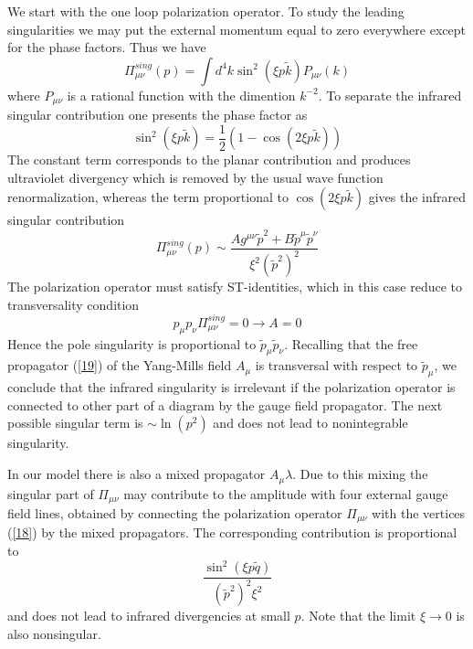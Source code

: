 \documentclass[a4paper,12pt]{article}
\begin{document}
 We start with the one loop polarization operator. To study the leading 
 singularities we may put the external momentum equal to zero everywhere 
except for the phase factors. Thus we have
\begin{equation}   
\Pi_{\mu \nu}^{sing}(p)= \int d^4k \sin^2(\xi p \tilde{k})P_{\mu 
\nu}(k)
 \label{20} \end{equation} 
where $P_{\mu \nu}$ is a rational function with the dimention $k^{-2}$. To 
separate the infrared singular contribution one presents the phase 
factor as 
\begin{equation} 
\sin^2(\xi p \tilde{k})= \frac{1}{2}(1- \cos(2\xi p \tilde{k}))
\label{21} 
\end{equation} 
The constant term corresponds to the planar contribution and produces 
ultraviolet divergency which is removed by the usual wave function 
renormalization, whereas the term proportional to $ \cos(2\xi p 
\tilde{k})$ gives the infrared singular contribution \begin{equation} 
\Pi_{\mu \nu}^{sing}(p) \sim \frac{Ag^{\mu 
\nu}\tilde{p}^2+B\tilde{p}^{\mu} \tilde{p}^{\nu}}{ \xi^2(\tilde{p}^2)^2} 
 \label{22} 
\end{equation} 
The polarization operator must satisfy ST-identities, which in this case 
reduce to transversality condition
\begin{equation}
p_{\mu}p_{\nu} \Pi_{\mu \nu}^{sing}=0 \rightarrow A=0
\label{23} 
\end{equation} 
Hence the pole singularity is proportional to $ \tilde{p}_{\mu} 
\tilde{p}_{\nu}$.  Recalling that the free propagator (\ref{19}) of the 
Yang-Mills field $A_{\mu}$ is transversal with respect to $ 
\tilde{p}_{\mu}$, we conclude that the infrared singularity is 
irrelevant if the polarization operator is connected to other part of 
a diagram by the gauge field propagator.
 The next possible singular term is $ \sim \ln(p^2)$ and 
does not lead to nonintegrable singularity.

In our model there is also a mixed propagator $A_{\mu} \lambda$. 
 Due to this mixing the singular part of $\Pi_{\mu \nu}$ may contribute to 
 the amplitude with four external gauge field lines, obtained by 
connecting the polarization operator $\Pi_{\mu \nu}$ with the 
vertices (\ref{18}) by the mixed propagators. The corresponding 
contribution is proportional to 
\begin{equation}
\frac{\sin^2( \xi p \tilde{q})}{(\tilde{p}^2)^2 \xi^2}
\label{23a}
\end{equation}
and does not lead to infrared divergencies at small $p$. Note that the 
limit $\xi \rightarrow 0$ is also nonsingular.
\end{document}
